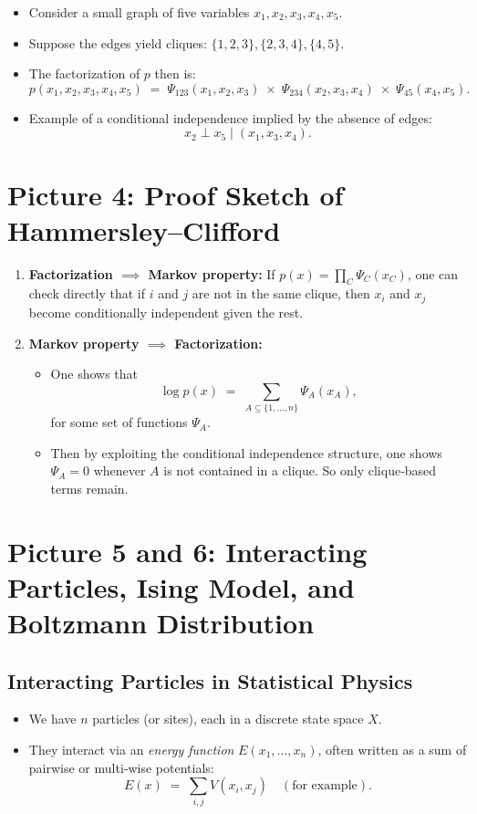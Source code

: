 \documentclass{article}%
\begin{document}
\begin{itemize}
    \item Consider a small graph of five variables \(x_1, x_2, x_3, x_4, x_5\).
    \item Suppose the edges yield cliques: \(\{1,2,3\}, \{2,3,4\}, \{4,5\}\).
    \item The factorization of \(p\) then is:
    \[
      p(x_1, x_2, x_3, x_4, x_5)
      \;=\;
      \Psi_{123}(x_1, x_2, x_3)\;\times\;\Psi_{234}(x_2, x_3, x_4)\;\times\;\Psi_{45}(x_4, x_5).
    \]
    \item Example of a conditional independence implied by the absence of edges: 
    \[
      x_2 \perp x_5 \;\Big|\; (x_1, x_3, x_4).
    \]
\end{itemize}

\section{Picture 4: Proof Sketch of Hammersley--Clifford}

\begin{enumerate}
    \item \textbf{Factorization \(\implies\) Markov property:} If \(p(x) = \prod_C \Psi_C(x_C)\), one can check directly that if \(i\) and \(j\) are not in the same clique, then \(x_i\) and \(x_j\) become conditionally independent given the rest.
    \item \textbf{Markov property \(\implies\) Factorization:} 
    \begin{itemize}
        \item One shows that 
        \[
          \log p(x) \;=\; \sum_{A \subseteq \{1,\dots,n\}} \Psi_A(x_A),
        \]
        for some set of functions \(\Psi_A\).
        \item Then by exploiting the conditional independence structure, one shows \(\Psi_A = 0\) whenever \(A\) is not contained in a clique. So only clique‐based terms remain.
    \end{itemize}
\end{enumerate}

\section{Picture 5 and 6: Interacting Particles, Ising Model, and Boltzmann Distribution}

\subsection*{Interacting Particles in Statistical Physics}
\begin{itemize}
    \item We have \(n\) particles (or sites), each in a discrete state space \(X\).
    \item They interact via an \emph{energy function} \(E(x_1,\dots,x_n)\), often written as a sum of pairwise or multi‐wise potentials:
    \[
      E(x) \;=\; \sum_{i,j} V(x_i, x_j) \quad(\text{for example}).
    \]
\end{itemize}
\end{document}
